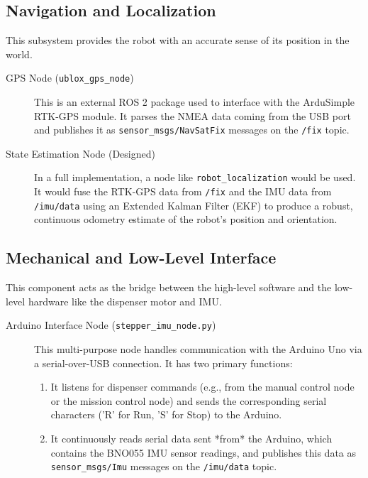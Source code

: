 \subsection{Navigation and Localization}
This subsystem provides the robot with an accurate sense of its position in the world.
\begin{description}
    \item[GPS Node (\texttt{ublox\_gps\_node})] This is an external ROS 2 package used to interface with the ArduSimple RTK-GPS module. It parses the NMEA data coming from the USB port and publishes it as \texttt{sensor\_msgs/NavSatFix} messages on the \texttt{/fix} topic.
    \item[State Estimation Node (Designed)] In a full implementation, a node like \texttt{robot\_localization} would be used. It would fuse the RTK-GPS data from \texttt{/fix} and the IMU data from \texttt{/imu/data} using an Extended Kalman Filter (EKF) to produce a robust, continuous odometry estimate of the robot's position and orientation.
\end{description}

\subsection{Mechanical and Low-Level Interface}
This component acts as the bridge between the high-level software and the low-level hardware like the dispenser motor and IMU.
\begin{description}
    \item[Arduino Interface Node (\texttt{stepper\_imu\_node.py})] This multi-purpose node handles communication with the Arduino Uno via a serial-over-USB connection. It has two primary functions:
    \begin{enumerate}
        \item It listens for dispenser commands (e.g., from the manual control node or the mission control node) and sends the corresponding serial characters ('R' for Run, 'S' for Stop) to the Arduino.
        \item It continuously reads serial data sent *from* the Arduino, which contains the BNO055 IMU sensor readings, and publishes this data as \texttt{sensor\_msgs/Imu} messages on the \texttt{/imu/data} topic.
    \end{enumerate}
\end{description}